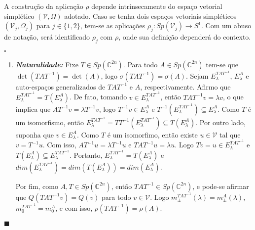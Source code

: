 \documentclass[12pt]{book}
\newenvironment{prova}[1]{$\square$ #1}{\hfill$\blacksquare$}
\newcommand{\autoespaco}[1]{E_{#1}}
\newcommand{\circulo}{S^{1}}
\newcommand{\complexificado}[1]{\mathcal{#1}}
\newcommand{\complexo}[1]{\mathbb{C}^{#1}}
\newcommand{\espectrooperador}[1]{\sigma(#1)}
\newcommand{\gruposimpletico}[1]{Sp(#1)}
\begin{document}
	A construção da aplicação $\rho$ depende intrinsecamente do espaço vetorial simplético $(\complexificado{V}, \Omega)$ adotado. Caso se tenha dois espaços vetoriais simpléticos $(\complexificado{V}_{j}, \Omega_{j})$ para $j\in \{1,2\}$, tem-se as aplicações $\rho_{j}:\gruposimpletico{\complexificado{V}_{j}} \to \circulo$. Com um abuso de notação, será identificado $\rho_{j}$ com $\rho$, onde sua definição dependerá do contexto.
	
	\begin{prova}
		
		\begin{enumerate}
			\item \textbf{\textit{Naturalidade:}} Fixe $T \in \gruposimpletico{\complexo{2n}}$. Para todo $A \in \gruposimpletico{\complexo{2n}}$ tem-se que $\det(TAT^{-1}) = \det(A)$, logo $\espectrooperador{TAT^{-1}} = \espectrooperador{A}$. Sejam $\autoespaco{\lambda}^{TAT^{-1}}$, $\autoespaco{\lambda}^{A}$ e auto-espaços generalizados de $TAT^{-1}$ e $A$, respectivamente. Afirmo que $\autoespaco{\lambda}^{TAT^{-1}} = T(\autoespaco{\lambda}^{A})$. De fato, tomando $v \in \autoespaco{\lambda}^{TAT^{-1}}$, então $TAT^{-1}v = \lambda v$, o que implica que $AT^{-1}v = \lambda T^{-1}v$, logo $T^{-1}v \in \autoespaco{\lambda}^{A}$ e $T^{-1}(\autoespaco{\lambda}^{TAT^{-1}}) \subseteq \autoespaco{\lambda}^{A}$. Como $T$ é um isomorfismo, então $\autoespaco{\lambda}^{TAT^{-1}} = TT^{-1}(\autoespaco{\lambda}^{TAT^{-1}}) \subseteq T(\autoespaco{\lambda}^{A})$. Por outro lado, suponha que $v\in \autoespaco{\lambda}^{A}$. Como $T$ é um isomorfimo, então existe $u \in \complexificado{V}$ tal que $v=T^{-1}u$. Com isso, $AT^{-1}u = \lambda T^{-1}u$ e $ TAT^{-1}u =\lambda u$. Logo $Tv=u \in \autoespaco{\lambda}^{TAT^{-1}}$ e $T(\autoespaco{\lambda}^{A}) \subseteq \autoespaco{\lambda}^{TAT^{-1}}$. Portanto, $\autoespaco{\lambda}^{TAT^{-1}}=T(\autoespaco{\lambda}^{A}) $ e $dim(\autoespaco{\lambda}^{TAT^{-1}})=dim(T(\autoespaco{\lambda}^{A}) )=dim(\autoespaco{\lambda}^{A})$.
			
			Por fim, como $A,T\in \gruposimpletico{\complexo{2n}}$, então $TAT^{-1}\in \gruposimpletico{\complexo{2n}}$, e pode-se afirmar que $Q(TAT^{-1}v) = Q(v)$ para todo $v \in \complexificado{V}$. Logo  $m^{TAT^{-1}}_{\pm}(\lambda)=m^{A}_{\pm}(\lambda)$, $m_{0}^{TAT^{-1}}=m_{0}^{A}$, e com isso, $\rho(TAT^{-1})=\rho(A)$.
			

\end{enumerate}
\end{prova}
\end{document}
